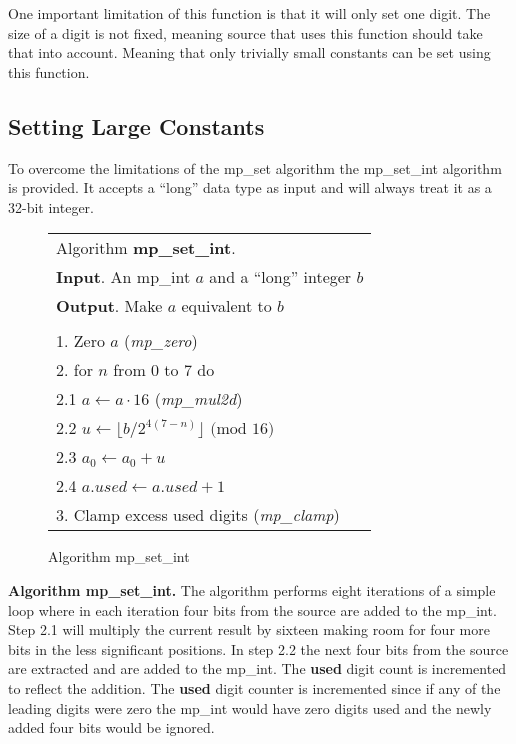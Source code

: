 \documentclass[b5paper]{book}
\begin{document}
One important limitation of this function is that it will only set one digit.  The size of a digit is not fixed, meaning source that uses 
this function should take that into account.  Meaning that only trivially small constants can be set using this function.

\subsection{Setting Large Constants}
To overcome the limitations of the mp\_set algorithm the mp\_set\_int algorithm is provided.  It accepts a ``long''
data type as input and will always treat it as a 32-bit integer.

\begin{figure}[here]
\begin{center}
\begin{tabular}{l}
\hline Algorithm \textbf{mp\_set\_int}. \\
\textbf{Input}.   An mp\_int $a$ and a ``long'' integer $b$ \\
\textbf{Output}.  Make $a$ equivalent to $b$ \\
\hline \\
1.  Zero $a$ (\textit{mp\_zero}) \\
2.  for $n$ from 0 to 7 do \\
\hspace{3mm}2.1  $a \leftarrow a \cdot 16$ (\textit{mp\_mul2d}) \\
\hspace{3mm}2.2  $u \leftarrow \lfloor b / 2^{4(7 - n)} \rfloor \mbox{ (mod }16\mbox{)}$\\
\hspace{3mm}2.3  $a_0 \leftarrow a_0 + u$ \\
\hspace{3mm}2.4  $a.used \leftarrow a.used + 1$ \\
3.  Clamp excess used digits (\textit{mp\_clamp}) \\
\hline
\end{tabular}
\end{center}
\caption{Algorithm mp\_set\_int}
\end{figure}

\textbf{Algorithm mp\_set\_int.}
The algorithm performs eight iterations of a simple loop where in each iteration four bits from the source are added to the 
mp\_int.  Step 2.1 will multiply the current result by sixteen making room for four more bits in the less significant positions.  In step 2.2 the
next four bits from the source are extracted and are added to the mp\_int. The \textbf{used} digit count is 
incremented to reflect the addition.  The \textbf{used} digit counter is incremented since if any of the leading digits were zero the mp\_int would have
zero digits used and the newly added four bits would be ignored.
\end{document}
